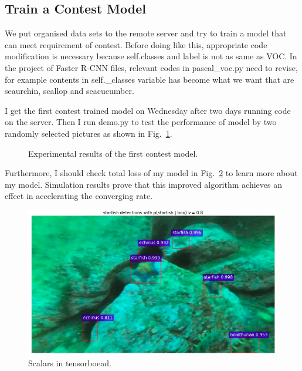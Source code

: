 \documentclass[a4paper]{article}
\begin{document}
\subsection{Train a Contest Model}

We put organised data sets to the remote server and try to train a model that can meet requirement of contest. Before doing like this, appropriate code modification is necessary because self.classes and label is not as same as VOC. In the project of Faster R-CNN files, relevant codes in pascal\_voc.py need to revise, for example contents in self.\_classes variable has become what we want that are seaurchin, scallop and seacucumber.

I get the first contest trained model on Wednesday after two days running code on the server. Then I run demo.py to test the performance of model by two randomly selected pictures as shown in Fig.~\ref{p2}.
\begin{figure}
	\centering 
	\caption{Experimental results of the first contest model.} 
	\label{p2} %
\end{figure}

Furthermore, I should check total loss of my model in Fig.~\ref{p3} to learn more about my model. Simulation results prove that this improved algorithm achieves an effect in accelerating the converging rate.
\begin{figure}
	\begin{center}
		\includegraphics[scale=0.4]{figures/5.png}
	\end{center}
	\caption{Scalars in tensorboead.}
	\label{p3}
\end{figure}
\end{document}
